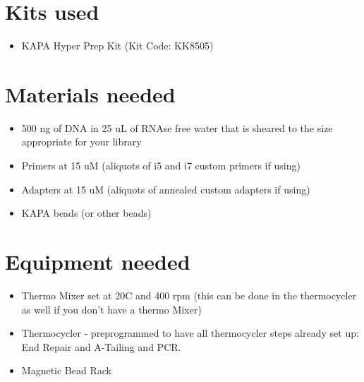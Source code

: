 \documentclass[
  letterpaper,
  DIV=11,
  numbers=noendperiod]{scrreprt}
\providecommand{\tightlist}{%
  \setlength{\itemsep}{0pt}\setlength{\parskip}{0pt}}\usepackage{longtable,booktabs,array}
\begin{document}
\hypertarget{kits-used}{%
\section*{\texorpdfstring{\textbf{Kits
used}}{Kits used}}\label{kits-used}}


\begin{itemize}
\tightlist
\item
  KAPA Hyper Prep Kit (Kit Code: KK8505)
\end{itemize}

\hypertarget{materials-needed}{%
\section*{\texorpdfstring{\textbf{Materials
needed}}{Materials needed}}\label{materials-needed}}


\begin{itemize}
\item
  500 ng of DNA in 25 uL of RNAse free water that is sheared to the size
  appropriate for your library
\item
  Primers at 15 uM (aliquots of i5 and i7 custom primers if using)
\item
  Adapters at 15 uM (aliquots of annealed custom adapters if using)
\item
  KAPA beads (or other beads)
\end{itemize}

\hypertarget{equipment-needed}{%
\section*{\texorpdfstring{\textbf{Equipment
needed}}{Equipment needed}}\label{equipment-needed}}


\begin{itemize}
\item
  Thermo Mixer set at 20C and 400 rpm (this can be done in the
  thermocycler as well if you don't have a thermo Mixer)
\item
  Thermocycler - preprogrammed to have all thermocycler steps already
  set up: End Repair and A-Tailing and PCR.
\item
  Magnetic Bead Rack
\end{itemize}
\end{document}
